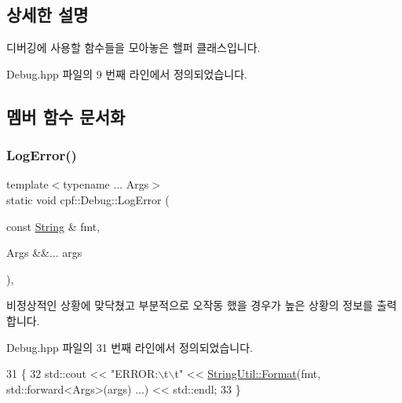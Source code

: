 \subsection{상세한 설명}
디버깅에 사용할 함수들을 모아놓은 핼퍼 클래스입니다. 

Debug.\+hpp 파일의 9 번째 라인에서 정의되었습니다.



\subsection{멤버 함수 문서화}
\mbox{\label{classcpf_1_1_debug_a3c867b9c24006a8b45b661b35efea6d2}} 
\subsubsection{\texorpdfstring{Log\+Error()}{LogError()}}
{\footnotesize\ttfamily template$<$typename ... Args$>$ \\
static void cpf\+::\+Debug\+::\+Log\+Error (\begin{DoxyParamCaption}\item[{const \hyperlink{namespacecpf_a4dbd6992c3ed4440ce7ed8982ff7ffea}{String} \&}]{fmt,  }\item[{Args \&\&...}]{args }\end{DoxyParamCaption})\hspace{0.3cm}{\ttfamily [inline]}, {\ttfamily [static]}}

비정상적인 상황에 맞닥쳤고 부분적으로 오작동 했을 경우가 높은 상황의 정보를 출력합니다. 

Debug.\+hpp 파일의 31 번째 라인에서 정의되었습니다.


\begin{DoxyCode}
31                                                                \{
32             std::cout << \textcolor{stringliteral}{"ERROR:\(\backslash\)t\(\backslash\)t"} << \hyperlink{classcpf_1_1_string_util_a965cca44ea396f01f2f3c5e3851f1001}{StringUtil::Format}(fmt, std::forward<Args>(args)
      ...) << std::endl;
33         \}
\end{DoxyCode}
\mbox{\label{classcpf_1_1_debug_a22849847c74bcb444922c263c9ae6183}} 
